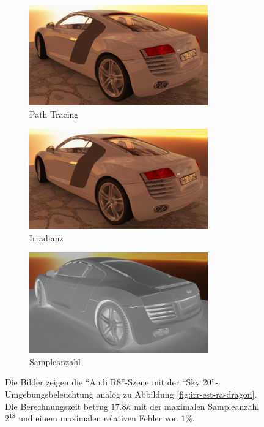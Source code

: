 		\begin{figure}[h]
			\begin{subfigure}[t]{\textwidth}
				\center
				\includegraphics[width=0.85\textwidth]{pic/irr_est-ra-r8_2-ref.png}
				\caption{Path Tracing}
			\end{subfigure}
			\begin{subfigure}[t]{\textwidth}
				\center
				\includegraphics[width=0.85\textwidth]{pic/irr_est-ra-r8_2-irr.png}
				\caption{Irradianz}
			\end{subfigure}
			\begin{subfigure}[t]{\textwidth}
				\center
				\includegraphics[width=0.85\textwidth]{pic/irr_est-ra-r8_2-scount.png}
				\caption{Sampleanzahl}
			\end{subfigure}
			\caption[Adaptive Vertex-Irradiance-Map anhand der \enquote{Audi R8}-Szene]{Die Bilder zeigen die \enquote{Audi R8}-Szene mit der \enquote{Sky 20}-Umgebungsbeleuchtung analog zu Abbildung \ref{fig:irr-est-ra-dragon}. Die Berechnungszeit betrug $17.8\unit{h}$ mit der maximalen Sampleanzahl $2^{18}$ und einem maximalen relativen Fehler von $1\unit{\%}$.}
			\label{fig:irr-est-ra-audi2}
		\end{figure}

